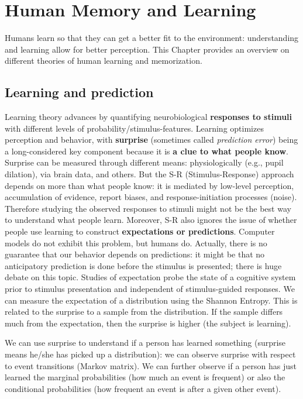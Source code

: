 \chapter{Human Memory and Learning}
\label{chap:modeling_memory}

Humans learn so that they can get a better fit to the environment: understanding and learning allow for better perception. This Chapter provides an overview on different theories of human learning and memorization. 

\section{Learning and prediction}
Learning theory  advances by quantifying neurobiological \textbf{responses to stimuli} with different levels of probability/stimulus-features. Learning optimizes perception and behavior, with \textbf{surprise} (sometimes called \textit{prediction error}) being a long-considered key component because it is \textbf{a clue to what people know}. Surprise can be measured through different means: physiologically (e.g., pupil dilation), via brain data, and others.
But the S-R (Stimulus-Response) approach depends on more than what people know: it is mediated by low-level perception, accumulation of evidence, report biases, and response-initiation processes (noise). Therefore studying the observed responses to stimuli might not be the best way to understand what people learn.
Moreover, S-R also ignores the issue of whether people use learning to construct \textbf{expectations or predictions}. Computer models do not exhibit this problem, but humans do. Actually, there is no guarantee that our behavior depends on predictions: it might be that no anticipatory prediction is done before the stimulus is presented; there is huge debate on this topic.
Studies of expectation probe the state of a cognitive system prior to stimulus presentation and independent of stimulus-guided responses. We can measure the expectation of a distribution using the Shannon Entropy. This is related to the surprise to a sample from the distribution. If the sample differs much from the expectation, then the surprise is higher (the subject is learning).

We can use surprise to understand if a person has learned something (surprise means he/she has picked up a distribution): we can observe surprise with respect to event transitions (Markov matrix). We can further observe if a person has just learned the marginal probabilities (how much an event is frequent) or also the conditional probabilities (how frequent an event is after a given other event).

